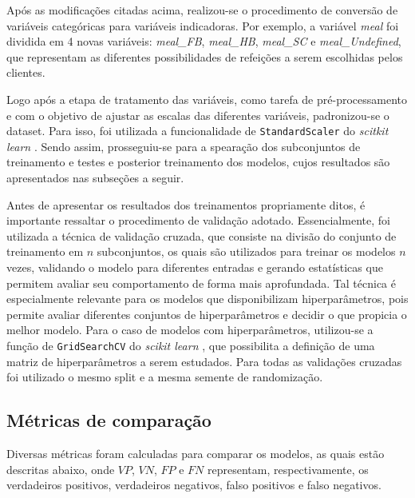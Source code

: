 \documentclass{homework}
\begin{document}
Após as modificações citadas acima, realizou-se o procedimento de conversão de variáveis categóricas para variáveis
indicadoras. Por exemplo, a variável \textit{meal} foi dividida em 4 novas variáveis: \textit{meal\_FB}, \textit{meal\_HB},
\textit{meal\_SC} e \textit{meal\_Undefined}, que representam as diferentes possibilidades de refeições a serem
escolhidas pelos clientes.

Logo após a etapa de tratamento das variáveis, como tarefa de pré-processamento e com o objetivo de ajustar as escalas
das diferentes variáveis, padronizou-se o dataset. Para isso, foi utilizada a funcionalidade de \texttt{StandardScaler}
do \textit{scitkit learn} \cite{standard_scaler}. Sendo assim, prosseguiu-se para a spearação dos subconjuntos de
treinamento e testes e posterior treinamento dos modelos, cujos resultados são apresentados nas subseções a seguir.

Antes de apresentar os resultados dos treinamentos propriamente ditos, é importante ressaltar o procedimento de
validação adotado. Essencialmente, foi utilizada a técnica de validação cruzada, que consiste na divisão do conjunto de
treinamento em $n$ subconjuntos, os quais são utilizados para treinar os modelos $n$ vezes, validando o modelo para
diferentes entradas e gerando estatísticas que permitem avaliar seu comportamento de forma mais aprofundada. Tal técnica
é especialmente relevante para os modelos que disponibilizam hiperparâmetros, pois permite avaliar diferentes conjuntos
de hiperparâmetros e decidir o que propicia o melhor modelo. Para o caso de modelos com hiperparâmetros, utilizou-se a
função de \texttt{GridSearchCV} do \textit{scikit learn} \cite{grid_search_cv}, que possibilita a definição de uma
matriz de hiperparâmetros a serem estudados. Para todas as validações cruzadas foi utilizado o mesmo split e a mesma
semente de randomização.

\subsection{Métricas de comparação}

Diversas métricas foram calculadas para comparar os modelos, as quais estão descritas abaixo, onde  $VP$, $VN$, $FP$ e
$FN$ representam, respectivamente, os verdadeiros positivos, verdadeiros negativos, falso positivos e falso negativos.
\end{document}
